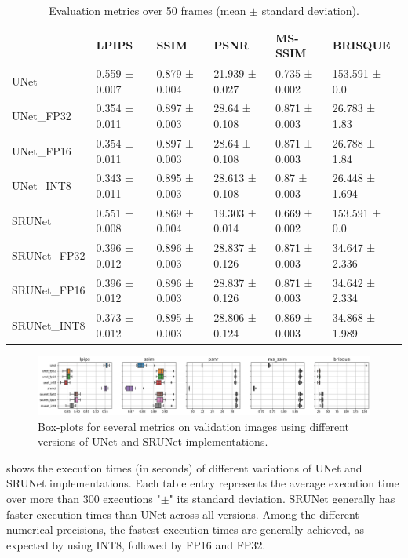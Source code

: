 \begin{table}[t]
\begin{tabular}{llllll}
\toprule
{} &          LPIPS &           SSIM &            PSNR &        MS-SSIM &         BRISQUE \\
\midrule
UNet        &  0.559 ± 0.007 &  0.879 ± 0.004 &  21.939 ± 0.027 &  0.735 ± 0.002 &   153.591 ± 0.0 \\
UNet\_FP32   &  0.354 ± 0.011 &  0.897 ± 0.003 &   28.64 ± 0.108 &  0.871 ± 0.003 &   26.783 ± 1.83 \\
UNet\_FP16   &  0.354 ± 0.011 &  0.897 ± 0.003 &   28.64 ± 0.108 &  0.871 ± 0.003 &   26.788 ± 1.84 \\
UNet\_INT8   &  0.343 ± 0.011 &  0.895 ± 0.003 &  28.613 ± 0.108 &   0.87 ± 0.003 &  26.448 ± 1.694 \\
SRUNet      &  0.551 ± 0.008 &  0.869 ± 0.004 &  19.303 ± 0.014 &  0.669 ± 0.002 &   153.591 ± 0.0 \\
SRUNet\_FP32 &  0.396 ± 0.012 &  0.896 ± 0.003 &  28.837 ± 0.126 &  0.871 ± 0.003 &  34.647 ± 2.336 \\
SRUNet\_FP16 &  0.396 ± 0.012 &  0.896 ± 0.003 &  28.837 ± 0.126 &  0.871 ± 0.003 &  34.642 ± 2.334 \\
SRUNet\_INT8 &  0.373 ± 0.012 &  0.895 ± 0.003 &  28.806 ± 0.124 &  0.869 ± 0.003 &  34.868 ± 1.989 \\
\bottomrule
\end{tabular}
\caption{Evaluation metrics over 50 frames (mean $\pm$ standard deviation).}
\label{tab:metrics}
\end{table}

\begin{figure}[ht]
\includegraphics[width=1.0\textwidth]{static/2023_03_02_boxplots_metrics_all.png}
\caption{Box-plots for several metrics on validation images using different versions of UNet and SRUNet implementations.}
\label{fig:metrics}
\end{figure}

 shows the execution times (in seconds) of different variations of UNet and SRUNet implementations. Each table entry represents the average execution time over more than 300 executions "$\pm$" its standard deviation. SRUNet generally has faster execution times than UNet across all versions. Among the different numerical precisions, the fastest execution times are generally achieved, as expected by using INT8, followed by FP16 and FP32.

